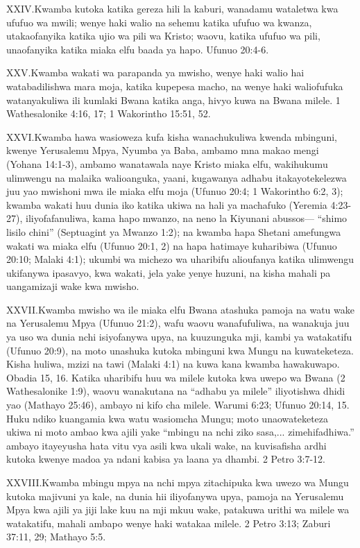 \lettrine{XXIV.} Kwamba kutoka katika gereza hili la kaburi, wanadamu wataletwa kwa ufufuo wa mwili; wenye haki walio na sehemu katika ufufuo wa kwanza, utakaofanyika katika ujio wa pili wa Kristo; waovu, katika ufufuo wa pili, unaofanyika katika miaka elfu baada ya hapo. Ufunuo 20:4-6.

\lettrine{XXV.} Kwamba wakati wa parapanda ya mwisho, wenye haki walio hai watabadilishwa mara moja, katika kupepesa macho, na wenye haki waliofufuka watanyakuliwa ili kumlaki Bwana katika anga, hivyo kuwa na Bwana milele. 1 Wathesalonike 4:16, 17; 1 Wakorintho 15:51, 52.

\lettrine{XXVI.} Kwamba hawa wasioweza kufa kisha wanachukuliwa kwenda mbinguni, kwenye Yerusalemu Mpya, Nyumba ya Baba, ambamo mna makao mengi (Yohana 14:1-3), ambamo wanatawala naye Kristo miaka elfu, wakihukumu ulimwengu na malaika walioanguka, yaani, kugawanya adhabu itakayotekelezwa juu yao mwishoni mwa ile miaka elfu moja (Ufunuo 20:4; 1 Wakorintho 6:2, 3); kwamba wakati huu dunia iko katika ukiwa na hali ya machafuko (Yeremia 4:23-27), iliyofafanuliwa, kama hapo mwanzo, na neno la Kiyunani abussos— “shimo lisilo chini” (Septuagint ya Mwanzo 1:2); na kwamba hapa Shetani amefungwa wakati wa miaka elfu (Ufunuo 20:1, 2) na hapa hatimaye kuharibiwa (Ufunuo 20:10; Malaki 4:1); ukumbi wa michezo wa uharibifu alioufanya katika ulimwengu ukifanywa ipasavyo, kwa wakati, jela yake yenye huzuni, na kisha mahali pa uangamizaji wake kwa mwisho.

\lettrine{XXVII.} Kwamba mwisho wa ile miaka elfu Bwana atashuka pamoja na watu wake na Yerusalemu Mpya (Ufunuo 21:2), wafu waovu wanafufuliwa, na wanakuja juu ya uso wa dunia nchi isiyofanywa upya, na kuuzunguka mji, kambi ya watakatifu (Ufunuo 20:9), na moto unashuka kutoka mbinguni kwa Mungu na kuwateketeza. Kisha huliwa, mzizi na tawi (Malaki 4:1) na kuwa kana kwamba hawakuwapo. Obadia 15, 16. Katika uharibifu huu wa milele kutoka kwa uwepo wa Bwana (2 Wathesalonike 1:9), waovu wanakutana na “adhabu ya milele” iliyotishwa dhidi yao (Mathayo 25:46), ambayo ni kifo cha milele. Warumi 6:23; Ufunuo 20:14, 15. Huku ndiko kuangamia kwa watu wasiomcha Mungu; moto unaowateketeza ukiwa ni moto ambao kwa ajili yake “mbingu na nchi ziko sasa,... zimehifadhiwa.” ambayo itayeyusha hata vitu vya asili kwa ukali wake, na kuvisafisha ardhi kutoka kwenye madoa ya ndani kabisa ya laana ya dhambi. 2 Petro 3:7-12.

\lettrine{XXVIII.} Kwamba mbingu mpya na nchi mpya zitachipuka kwa uwezo wa Mungu kutoka majivuni ya kale, na dunia hii iliyofanywa upya, pamoja na Yerusalemu Mpya kwa ajili ya jiji lake kuu na mji mkuu wake, patakuwa urithi wa milele wa watakatifu, mahali ambapo wenye haki watakaa milele. 2 Petro 3:13; Zaburi 37:11, 29; Mathayo 5:5.

